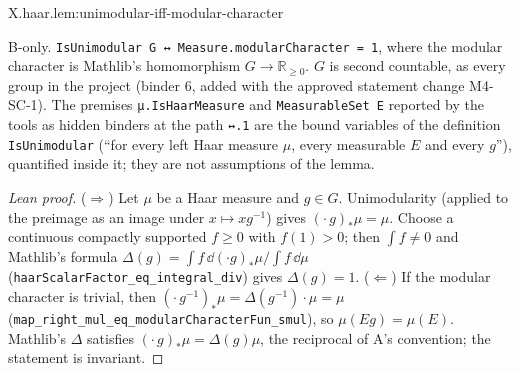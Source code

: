 \begin{lemma}
\bonly
{}
\end{lemma}
\begin{tfformal}{X.haar.lem:unimodular-iff-modular-character}
\begin{tffidelity}
B-only. \texttt{IsUnimodular G ↔ Measure.modularCharacter = 1}, where the modular character is Mathlib's homomorphism $G\to\mathbb R_{\ge0}$. $G$ is second countable, as every group in the project (binder 6, added with the approved statement change M4-SC-1). The premises \texttt{μ.IsHaarMeasure} and \texttt{MeasurableSet E} reported by the tools as hidden binders at the path \texttt{↔.1} are the bound variables of the definition \texttt{IsUnimodular} (``for every left Haar measure $\mu$, every measurable $E$ and every $g$''), quantified inside it; they are not assumptions of the lemma.
\end{tffidelity}
\end{tfformal}
\begin{proof}[Lean proof]
($\Rightarrow$) Let $\mu$ be a Haar measure and $g\in G$. Unimodularity (applied to the preimage as an image under $x\mapsto xg^{-1}$) gives $(\cdot\,g)_*\mu=\mu$. Choose a continuous compactly supported $f\ge0$ with $f(1)>0$; then $\int f\ne0$ and Mathlib's formula $\Delta(g)=\int f\,\dd(\cdot g)_*\mu\big/\int f\,\dd\mu$ (\texttt{haarScalarFactor\_eq\_integral\_div}) gives $\Delta(g)=1$. ($\Leftarrow$) If the modular character is trivial, then $(\cdot\,g^{-1})_*\mu=\Delta(g^{-1})\cdot\mu=\mu$ (\texttt{map\_right\_mul\_eq\_modularCharacterFun\_smul}), so $\mu(Eg)=\mu(E)$. Mathlib's $\Delta$ satisfies $(\cdot\,g)_*\mu=\Delta(g)\mu$, the reciprocal of A's convention; the statement is invariant.
\end{proof}


